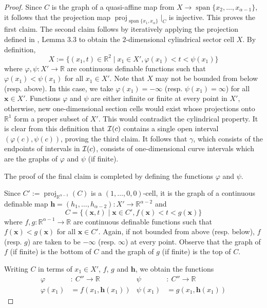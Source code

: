 \documentclass[
]{book}
\theoremstyle{definition}
\theoremstyle{definition}
\theoremstyle{definition}
\theoremstyle{definition}
\theoremstyle{remark}
\begin{document}
\begin{proof}
Since \(C\) is the graph of a quasi-affine map from \(X \to {\operatorname{span} \{x_2,\ldots,x_{\alpha - 1}\}}\), it follows that the projection map \({\operatorname{proj}_{{\operatorname{span} \{x_1,x_\alpha\}}}}\vert_C\) is injective. This proves the first claim. The second claim follows by iteratively applying the projection defined in \citet{bgv15}, Lemma 3.3 to obtain the \(2\)-dimensional cylindrical sector cell \(X\).
By definition, \[
X := \{ (x_1,t) \in \mathbb{R}^2 \mid x_1 \in X', \varphi(x_1) < t < \psi(x_1) \}
\]
where \(\varphi,\psi : X' \to \mathbb{R}\) are continuous definable functions such that \(\varphi(x_1) < \psi(x_1)\) for all \(x_1 \in X'\).
Note that \(X\) may not be bounded from below (resp. above). In this case, we take \(\varphi(x_1) = -\infty\) (resp. \(\psi(x_1) = \infty\)) for all \(\mathbf{x} \in X'\). Functions \(\varphi\) and \(\psi\) are either infinite or finite at every point in \(X'\), otherwise, new one-dimensional section cells would exist whose projections onto \(\mathbb{R}^1\) form a proper subset of \(X'\). This would contradict the cylindrical property.
It is clear from this definition that \({\cal I}(c)\) contains a single open interval \((\varphi(c), \psi(c))\), proving the third claim. It follows that \(\gamma\), which consists of the endpoints of intervals in \({\cal I}(c)\), consists of one-dimensional curve intervals which are the graphs of \(\varphi\) and \(\psi\) (if finite).

The proof of the final claim is completed by defining the functions \(\varphi\) and \(\psi\).

Since \(C' := {\operatorname{proj}_{\mathbb{R}^{\alpha - 1}}}(C)\) is a \((1,\ldots,0,0)\)-cell, it is the graph of a continuous definable map \(\mathbf{h} = (h_1,\ldots,h_{\alpha - 2}) : X' \to \mathbb{R}^{\alpha - 2}\) and \[
C = \{ (\mathbf{x},t) \mid \mathbf{x} \in C', f(\mathbf{x}) < t < g(\mathbf{x})\}
\]
where \(f,g : \mathbb{R}^{\alpha - 1} \to \mathbb{R}\) are continuous definable functions such that \(f(\mathbf{x}) < g(\mathbf{x})\) for all \(\mathbf{x} \in C'\).
Again, if not bounded from above (resp. below), \(f\) (resp. \(g\)) are taken to be \(-\infty\) (resp. \(\infty\)) at every point.
Observe that the graph of \(f\) (if finite) is the bottom of \(C\) and the graph of \(g\) (if finite) is the top of \(C\).

Writing \(C\) in terms of \(x_1 \in X'\), \(f\), \(g\) and \(\mathbf{h}\), we obtain the functions
\begin{align}
\varphi &:\> C'' \to \mathbb{R}& \psi &:\> C'' \to \mathbb{R}\\
\varphi(x_1) &= f(x_1,\mathbf{h}(x_1)) & \psi(x_1) &= g(x_1,\mathbf{h}(x_1))
\label{eq:phi-psi}
\end{align}
\end{proof}
\end{document}
